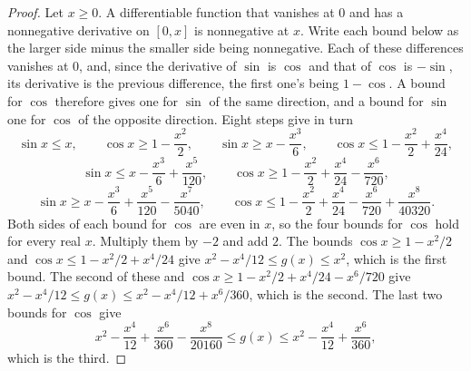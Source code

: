 \begin{proof}
\leanok
Let $x \ge 0$. A differentiable function that vanishes at $0$ and has a nonnegative derivative on
$[0, x]$ is nonnegative at $x$. Write each bound below as the larger side minus the smaller side
being nonnegative. Each of these differences vanishes at $0$, and, since the derivative of $\sin$ is
$\cos$ and that of $\cos$ is $-\sin$, its derivative is the previous difference, the first one's
being $1 - \cos$. A bound for $\cos$ therefore gives one for $\sin$ of the same direction, and a
bound for $\sin$ one for $\cos$ of the opposite direction. Eight steps give in turn
\[
  \sin x \le x, \qquad \cos x \ge 1 - \frac{x^2}{2}, \qquad \sin x \ge x - \frac{x^3}{6}, \qquad
  \cos x \le 1 - \frac{x^2}{2} + \frac{x^4}{24},
\]
\[
  \sin x \le x - \frac{x^3}{6} + \frac{x^5}{120}, \qquad
  \cos x \ge 1 - \frac{x^2}{2} + \frac{x^4}{24} - \frac{x^6}{720},
\]
\[
  \sin x \ge x - \frac{x^3}{6} + \frac{x^5}{120} - \frac{x^7}{5040}, \qquad
  \cos x \le 1 - \frac{x^2}{2} + \frac{x^4}{24} - \frac{x^6}{720} + \frac{x^8}{40320} .
\]
Both sides of each bound for $\cos$ are even in $x$, so the four bounds for $\cos$ hold for every
real $x$. Multiply them by $-2$ and add $2$. The bounds $\cos x \ge 1 - x^2/2$ and
$\cos x \le 1 - x^2/2 + x^4/24$ give $x^2 - x^4/12 \le g(x) \le x^2$, which is the first bound. The
second of these and $\cos x \ge 1 - x^2/2 + x^4/24 - x^6/720$ give
$x^2 - x^4/12 \le g(x) \le x^2 - x^4/12 + x^6/360$, which is the second. The last two bounds for
$\cos$ give
\[
  x^2 - \frac{x^4}{12} + \frac{x^6}{360} - \frac{x^8}{20160} \le g(x)
  \le x^2 - \frac{x^4}{12} + \frac{x^6}{360} ,
\]
which is the third.
\end{proof}

